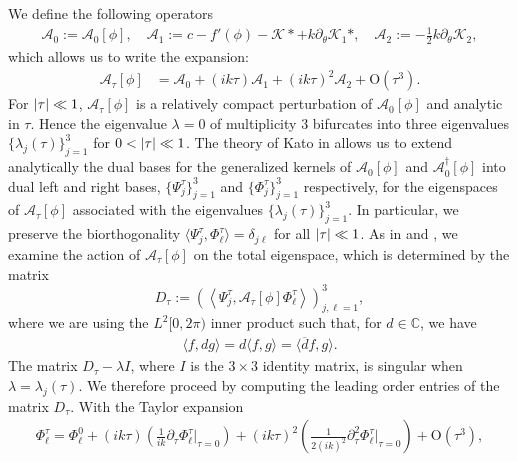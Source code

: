 \documentclass[11pt,leqno]{article}
\numberwithin{equation}{section}
\newcommand{\C}{\mathbb C}
\newcommand\LA{\left\langle}
\newcommand\RA{\right\rangle}
\theoremstyle{definition}
\begin{document}
We define the following operators
\begin{align}
	\mathcal{A}_{0} := \mathcal{A}_{0}[\phi],\quad \mathcal{A}_{1} := c - f'(\phi) - \mathcal{K}* + k\partial_{\theta}\mathcal{K}_{1}*,\quad \mathcal{A}_{2} := -\frac{1}{2}k\partial_{\theta}\mathcal{K}_{2},\label{eq:Adefs}
\end{align}
which allows us to write the expansion:
\begin{align}
	\mathcal{A}_{\tau}[\phi] &= \mathcal{A}_{0} + (ik\tau)\mathcal{A}_{1} + (ik\tau)^{2}\mathcal{A}_{2} + \mathrm{O}(\tau^{3}). \label{eq:Aexpansion}
\end{align}
For $ \abs{\tau} \ll 1 $, $ \mathcal{A}_{\tau}[\phi] $ is a relatively compact perturbation of $ \mathcal{A}_{0}[\phi] $ and analytic in $ \tau $. Hence the eigenvalue $ \lambda = 0 $ of multiplicity $ 3 $ bifurcates into three eigenvalues $ \{\lambda_{j}(\tau)\}_{j = 1}^{3} $ for $ 0 < \abs{\tau} \ll 1 $. The theory of Kato in \cite{K76} allows us to extend analytically the dual bases for the generalized kernels of $ \mathcal{A}_{0}[\phi] $ and $ \mathcal{A}_{0}^{\dagger}[\phi] $ into dual left and right bases, $ \{\Psi_{j}^{\tau}\}_{j = 1}^{3} $ and $  \{\Phi_{j}^{\tau}\}_{j = 1}^{3} $ respectively, for the eigenspaces of $ \mathcal{A}_{\tau}[\phi] $ associated with the eigenvalues $ \{\lambda_{j}(\tau)\}_{j = 1}^{3} $. In particular, we preserve the biorthogonality $ \langle \Psi_{j}^{\tau},\Phi_{\ell}^{\tau}\rangle = \delta_{j\ell} $ for all $ \abs{\tau}\ll 1 $. As in \cite[Theorem 1]{BNR14} and \cite{JP2020}, we examine the action of $ \mathcal{A}_{\tau}[\phi] $ on the total eigenspace, which is determined by the matrix
\[
D_{\tau}:=\left(\LA\Psi_j^\tau,\mathcal{A}_\tau[\phi]\Phi_\ell^\tau\RA\right)_{j,\ell=1}^3,
\]
where we are using the $ L^{2}[0,2\pi) $ inner product such that, for $ d \in \C $, we have
\begin{align*}
	\langle f, d g\rangle = d\langle f,g\rangle = \langle \overline{d} f,g\rangle.
\end{align*}
The matrix $ D_{\tau} - \lambda I $, where $ I $ is the $ 3\times3 $ identity matrix, is singular when $ \lambda = \lambda_{j}(\tau) $. We therefore proceed by computing the leading order entries of the matrix $ D_{\tau} $. With the Taylor expansion
\begin{align*}
	\Phi_{\ell}^{\tau} = \Phi_{\ell}^{0} + (ik\tau)\left(\frac{1}{ik}\partial_{\tau}\Phi_{\ell}^{\tau}\bigg|_{\tau = 0}\right) + (ik\tau)^{2}\left(\frac{1}{2(ik)^{2}}\partial_{\tau}^{2}\Phi_{\ell}^{\tau}\bigg|_{\tau = 0}\right) + \mathrm{O}(\tau^{3}),
\end{align*}
\end{document}
